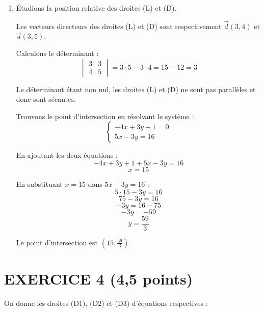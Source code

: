 \documentclass[12pt]{article}
\begin{document}
\begin{enumerate}
    \item Étudions la position relative des droites (L) et (D).

    Les vecteurs directeurs des droites (L) et (D) sont respectivement \(\vec{d}(3, 4)\) et \(\vec{u}(3, 5)\).

    Calculons le déterminant :
    \[
    \begin{vmatrix}
    3 & 3 \\
    4 & 5
    \end{vmatrix} = 3 \cdot 5 - 3 \cdot 4 = 15 - 12 = 3
    \]

    Le déterminant étant non nul, les droites (L) et (D) ne sont pas parallèles et donc sont sécantes.

    Trouvons le point d'intersection en résolvant le système :
    \[
    \begin{cases}
    -4x + 3y + 1 = 0 \\
    5x - 3y = 16
    \end{cases}
    \]

    En ajoutant les deux équations :
    \[
    -4x + 3y + 1 + 5x - 3y = 16
    \]
    \[
    x = 15
    \]

    En substituant \(x = 15\) dans \(5x - 3y = 16\) :
    \[
    5 \cdot 15 - 3y = 16
    \]
    \[
    75 - 3y = 16
    \]
    \[
    -3y = 16 - 75
    \]
    \[
    -3y = -59
    \]
    \[
    y = \frac{59}{3}
    \]

    Le point d'intersection est \((15, \frac{59}{3})\).
\end{enumerate}

\section*{EXERCICE 4 (4,5 points)}
On donne les droites (D1), (D2) et (D3) d’équations respectives :
\end{document}
